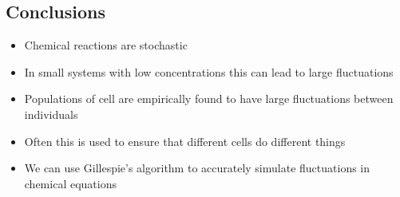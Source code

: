 
\begin{slide}
\section{Conclusions}

\begin{PauseHighLight}
  \begin{itemize}
  \item Chemical reactions are stochastic\pause
  \item In small systems with low concentrations this can lead to large
    fluctuations\pause
  \item Populations of cell are empirically found to have large
    fluctuations between individuals\pause
  \item Often this is used to ensure that different cells do different
    things\pause
  \item We can use Gillespie's algorithm to accurately simulate
    fluctuations in chemical equations\pause
  \end{itemize}
\end{PauseHighLight}

\end{slide}
